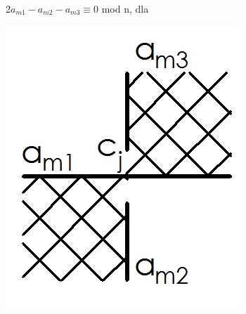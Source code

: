 	\begin{minipage}{0.5\textwidth}
$2a_{m1}-a_{m2}-a_{m3} \equiv 0$ mod n, dla \\
	\begin{center}
			\includegraphics[scale=0.3]{2/Obrazy/Cros-}
	\end{center}	
	\end{minipage}

